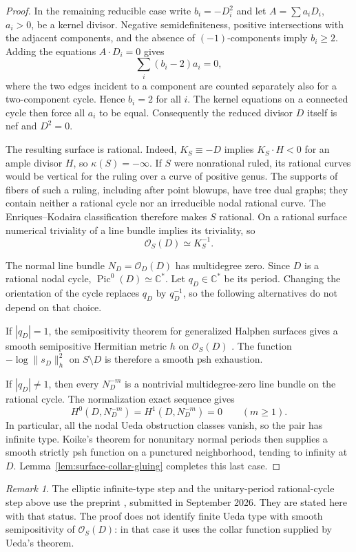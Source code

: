 \documentclass[11pt]{amsart}
\theoremstyle{definition}
\theoremstyle{remark}
\newtheorem{remark}[theorem]{Remark}
\numberwithin{equation}{section}
\newcommand{\C}{\mathbb C}
\newcommand{\OO}{\mathcal O}
\begin{document}
\begin{proof}
In the remaining reducible case write $b_i=-D_i^2$ and let
$A=\sum a_iD_i$, $a_i>0$, be a kernel divisor.  Negative
semidefiniteness, positive intersections with the adjacent components,
and the absence of $(-1)$-components imply $b_i\ge2$.
Adding the equations $A\cdot D_i=0$ gives
\[
 \sum_i (b_i-2)a_i=0,
\]
where the two edges incident to a component are counted separately
also for a two-component cycle.  Hence $b_i=2$ for all $i$.
The kernel equations on a connected cycle then force all $a_i$ to
be equal.  Consequently the reduced divisor $D$ itself is nef and
$D^2=0$.

The resulting surface is rational.  Indeed, $K_S\equiv-D$ implies
$K_S\cdot H<0$ for an ample divisor $H$, so $\kappa(S)=-\infty$.
If $S$ were nonrational ruled, its rational curves would be vertical
for the ruling over a curve of positive genus.  The supports of fibers
of such a ruling, including after point blowups, have tree dual graphs;
they contain neither a rational cycle nor an irreducible nodal rational
curve.  The Enriques--Kodaira classification therefore makes $S$
rational.  On a rational surface numerical triviality of a line bundle
implies its triviality, so
\[
 \OO_S(D)\simeq K_S^{-1}.
\]

The normal line bundle $N_D=\OO_D(D)$ has multidegree zero.  Since
$D$ is a rational nodal cycle, $\operatorname{Pic}^0(D)\simeq\C^*$.
Let $q_D\in\C^*$ be its period.  Changing the orientation of the
cycle replaces $q_D$ by $q_D^{-1}$, so the following alternatives do
not depend on that choice.

If $|q_D|=1$, the semipositivity theorem for generalized Halphen
surfaces gives a smooth semipositive Hermitian metric $h$ on
$\OO_S(D)$ \cite[Proposition~6.2\textup{(B)}]{CFSTZ2026}.
The function $-\log\|s_D\|_h^2$ on $S\setminus D$ is therefore
a smooth psh exhaustion.

If $|q_D|\ne1$, then every $N_D^{-m}$ is a nontrivial multidegree-zero
line bundle on the rational cycle.  The normalization exact sequence
gives
\[
 H^0(D,N_D^{-m})=H^1(D,N_D^{-m})=0\qquad(m\ge1).
\]
In particular, all the nodal Ueda obstruction classes vanish, so the
pair has infinite type.  Koike's theorem for nonunitary normal periods
\cite[Theorem~1.6]{KoikeNodes2017} then supplies a smooth strictly
psh function on a punctured neighborhood, tending to infinity at $D$.
Lemma~\ref{lem:surface-collar-gluing} completes this last case.
\end{proof}

\begin{remark}\label{rem:surface-cy-recent}
The elliptic infinite-type step and the unitary-period rational-cycle
step above use the preprint \cite{CFSTZ2026}, submitted in September
2026.  They are stated here with that status.  The proof does not
identify finite Ueda type with smooth semipositivity of $\OO_S(D)$:
in that case it uses the collar function supplied by Ueda's theorem.
\end{remark}
\end{document}
